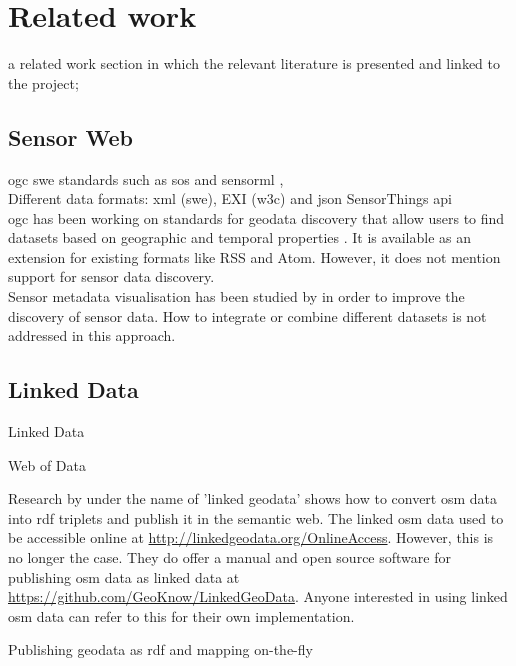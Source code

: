 \chapter{Related work}
\label{chap:rw}

a related work section in which the relevant literature is presented and linked to the project;

\iffalse
\section{Sensor Web}

\ac{ogc} \ac{swe} standards such as \ac{sos} and \ac{sensorml} \citep{SW:OGC}, \citep{SW:Botts} \\

Different data formats: \ac{xml} (\ac{swe}), EXI (\ac{w3c}) and \ac{json} SensorThings \ac{api} \citep{IOT:Zanelli} \\

\ac{ogc} has been working on standards for geodata discovery that allow users to find datasets based on geographic and temporal properties \citep{SW:OGC2}. It is available as an extension for existing formats like RSS and Atom. However, it does not mention support for sensor data discovery. \\

Sensor metadata visualisation has been studied by \cite{SW:Yoo} in order to improve the discovery of sensor data. How to integrate or combine different datasets is not addressed in this approach. 


\section{Linked Data}

Linked Data \citep{LD:Berners-lee}

Web of Data \cite{LD:Bizer} 

Research by \cite{LD:Auer} under the name of 'linked geodata' shows how to convert \ac{osm} data into \ac{rdf} triplets and publish it in the semantic web. The linked \ac{osm} data used to be accessible online at \url{http://linkedgeodata.org/OnlineAccess}. However, this is no longer the case. They do offer a manual and open source software for publishing \ac{osm} data as linked data at \url{https://github.com/GeoKnow/LinkedGeoData}. Anyone interested in using linked \ac{osm} data can refer to this for their own implementation.     

Publishing geodata as \ac{rdf} and mapping on-the-fly \citep{LD:Missier}


